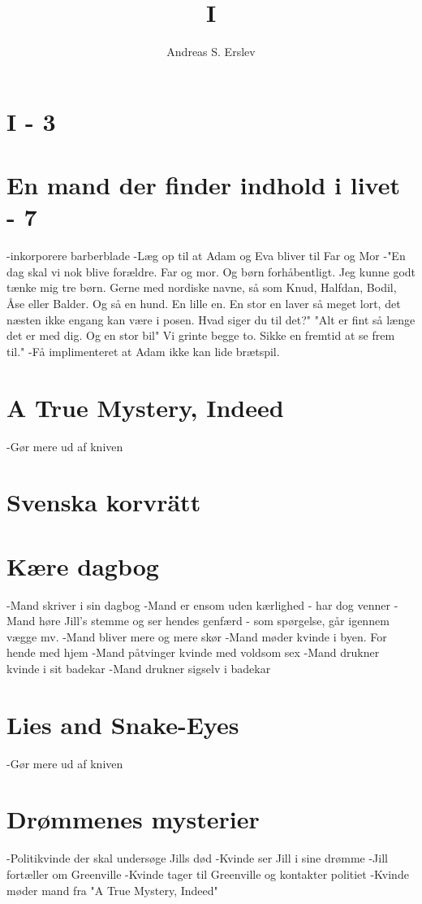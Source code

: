 \documentclass[]{article}
\title{I}
\author{Andreas S. Erslev}
\begin{document}
	
	\section{I - 3}
	
	\section{En mand der finder indhold i livet - 7}
	-inkorporere barberblade
	-Læg op til at Adam og Eva bliver til Far og Mor
	-"En dag skal vi nok blive forældre. Far og mor. Og børn forhåbentligt. Jeg kunne godt tænke mig tre børn. Gerne med nordiske navne, så som Knud, Halfdan, Bodil, Åse eller Balder. Og så en hund. En lille en. En stor en laver så meget lort, det næsten ikke engang kan være i posen. Hvad siger du til det?" "Alt er fint så længe det er med dig. Og en stor bil" Vi grinte begge to. Sikke en fremtid at se frem til."
	-Få implimenteret at Adam ikke kan lide brætspil.
	
	\section{A True Mystery, Indeed}
	-Gør mere ud af kniven
	
	\section{Svenska korvrätt}
	
	\section{Kære dagbog}
	-Mand skriver i sin dagbog
	-Mand er ensom uden kærlighed - har dog venner
	-Mand høre Jill's stemme og ser hendes genfærd - som spørgelse, går igennem vægge mv.
	-Mand bliver mere og mere skør
	-Mand møder kvinde i byen. For hende med hjem
	-Mand påtvinger kvinde med voldsom sex
	-Mand drukner kvinde i sit badekar
	-Mand drukner sigselv i badekar
	
	\section{Lies and Snake-Eyes}
	-Gør mere ud af kniven
	
	\section{Drømmenes mysterier}
	-Politikvinde der skal undersøge Jills død
	-Kvinde ser Jill i sine drømme
	-Jill fortæller om Greenville
	-Kvinde tager til Greenville og kontakter politiet
	-Kvinde møder mand fra "A True Mystery, Indeed"
	
\end{document}
